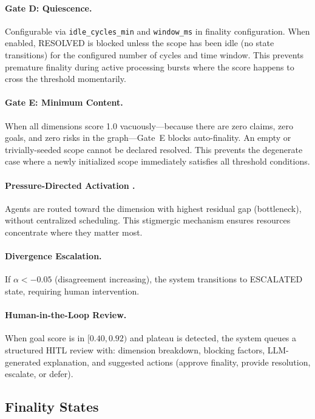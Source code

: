 \documentclass[11pt]{article}
\begin{document}
\paragraph{Gate D: Quiescence.}
Configurable via \texttt{idle\_cycles\_min} and \texttt{window\_ms} in finality configuration. When enabled, RESOLVED is blocked unless the scope has been idle (no state transitions) for the configured number of cycles and time window. This prevents premature finality during active processing bursts where the score happens to cross the threshold momentarily.

\paragraph{Gate E: Minimum Content.}
When all dimensions score 1.0 vacuously---because there are zero claims, zero goals, and zero risks in the graph---Gate~E blocks auto-finality. An empty or trivially-seeded scope cannot be declared resolved. This prevents the degenerate case where a newly initialized scope immediately satisfies all threshold conditions.

\paragraph{Pressure-Directed Activation \cite{dorigo2000}.}
Agents are routed toward the dimension with highest residual gap (bottleneck), without centralized scheduling. This stigmergic mechanism ensures resources concentrate where they matter most.

\paragraph{Divergence Escalation.}
If $\alpha < -0.05$ (disagreement increasing), the system transitions to ESCALATED state, requiring human intervention.

\paragraph{Human-in-the-Loop Review.}
When goal score is in $[0.40, 0.92)$ and plateau is detected, the system queues a structured HITL review with: dimension breakdown, blocking factors, LLM-generated explanation, and suggested actions (approve finality, provide resolution, escalate, or defer).

\subsection{Finality States}
\end{document}
